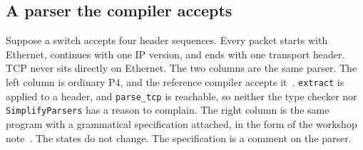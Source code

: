 \documentclass[a4paper,UKenglish,cleveref,autoref]{lipics-v2021}
\begin{document}
\subsection{A parser the compiler accepts}
\label{sec:motivating}

Suppose a switch accepts four header sequences.
Every packet starts with Ethernet, continues with one IP version, and ends with one transport header.
TCP never sits directly on Ethernet.
The two columns are the same parser.
The left column is ordinary P4, and the reference compiler accepts it~\cite{p4c}.
\texttt{extract} is applied to a header, and \texttt{parse\_tcp} is reachable, so neither the type checker nor \texttt{SimplifyParsers} has a reason to complain.
The right column is the same program with a grammatical specification attached, in the form of the workshop note~\cite{yuan2025fmano}.
The states do not change.
The specification is a comment on the parser.
\end{document}
